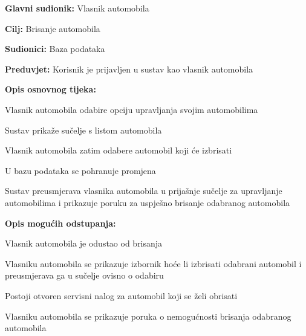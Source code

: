 \noindent {}
\begin{packed_item}

	\item \textbf{Glavni sudionik: } Vlasnik automobila
	\item  \textbf{Cilj:} Brisanje automobila
	\item  \textbf{Sudionici:} Baza podataka
	\item  \textbf{Preduvjet:} Korisnik je prijavljen u sustav kao vlasnik automobila
	\item  \textbf{Opis osnovnog tijeka:}

	\item[] \begin{packed_enum}

		\item Vlasnik automobila odabire opciju upravljanja svojim automobilima
		\item Sustav prikaže sučelje s listom automobila
		\item Vlasnik automobila zatim odabere automobil koji će izbrisati
		\item U bazu podataka se pohranuje promjena
		\item Sustav preusmjerava vlasnika automobila u prijašnje sučelje za upravljanje
		automobilima i prikazuje poruku za uspješno brisanje odabranog automobila

	\end{packed_enum}
	\item  \textbf{Opis mogućih odstupanja:}

	\item[] \begin{packed_item}

		\item[3.a] Vlasnik automobila je odustao od brisanja
		\item[] \begin{packed_enum}

			\item Vlasniku automobila se prikazuje izbornik hoće li izbrisati odabrani
			automobil i preusmjerava ga u sučelje ovisno o odabiru

		\end{packed_enum}

		\item[3.b] Postoji otvoren servisni nalog za automobil koji se želi
		obrisati
		\item[] \begin{packed_enum}

			\item Vlasniku automobila se prikazuje poruka o nemogućnosti brisanja odabranog
			automobila

		\end{packed_enum}

	\end{packed_item}

\end{packed_item}
